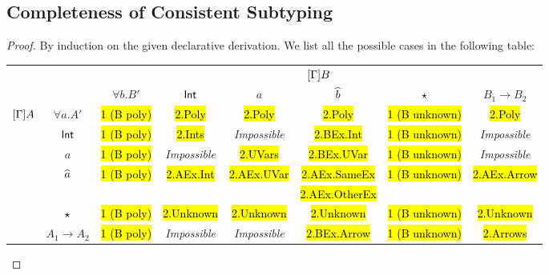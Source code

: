 \subsection{Completeness of Consistent Subtyping}

\subcomplete*
\begin{proof}
  By induction on the given declarative derivation. We list all the possible cases in the following table:

  \begin{center}
\begin{footnotesize}
\begin{tabular}{cccccccc} \toprule
&                 & \multicolumn{6}{c}{ $[\Gamma]B$  }  \\
&                 & $\forall b. B'$  & $\mathsf{Int}$      & $a$         & $\widehat{b}$     & $\star$          & $B_1 \to B_2$ \\ \cmidrule{3-8}
   \multirow{6}{*}{$[\Gamma]A$} & $\forall a. A'$ & \hl{1 (B poly)}  & \hl{2.Poly} & \hl{2.Poly} & \hl{2.Poly} & \hl{1 (B unknown)}         &  \hl{2.Poly}  \\ \cmidrule{3-8}
& $\mathsf{Int}$          & \hl{1 (B poly)}  &  \hl{2.Ints}           &  \textit{Impossible} & \hl{2.BEx.Int}            & \hl{1 (B unknown)}  &  \textit{Impossible}  \\ \cmidrule{3-8}
& $a$             &  \hl{1 (B poly)} & \textit{Impossible} &  \hl{2.UVars}           &  \hl{2.BEx.UVar}           &  \hl{1 (B unknown)} &  \textit{Impossible}  \\ \cmidrule{3-8}
& \multirow{2}{*}{$\widehat{a}$}         & \multirow{2}{*}{\hl{1 (B poly)}}   & \multirow{2}{*}{\hl{2.AEx.Int}} & \multirow{2}{*}{\hl{2.AEx.UVar}} & \hl{2.AEx.SameEx}  & \multirow{2}{*}{\hl{1 (B unknown)}}  & \multirow{2}{*}{\hl{2.AEx.Arrow}} \\
& & & & & \hl{2.AEx.OtherEx} &   &   \\ \cmidrule{3-8}
& $\star$      & \hl{1 (B poly)}  & \hl{2.Unknown} &  \hl{2.Unknown}  &  \hl{2.Unknown} & \hl{1 (B unknown)}  & \hl{2.Unknown} \\ \cmidrule{3-8}
  & $A_1 \to A_2$     & \hl{1 (B poly)}  & \textit{Impossible} &  \textit{Impossible}  & \hl{2.BEx.Arrow}  & \hl{1 (B unknown)}  & \hl{2.Arrows} \\ \bottomrule
\end{tabular}
\end{footnotesize}
  \end{center}


\end{proof}
